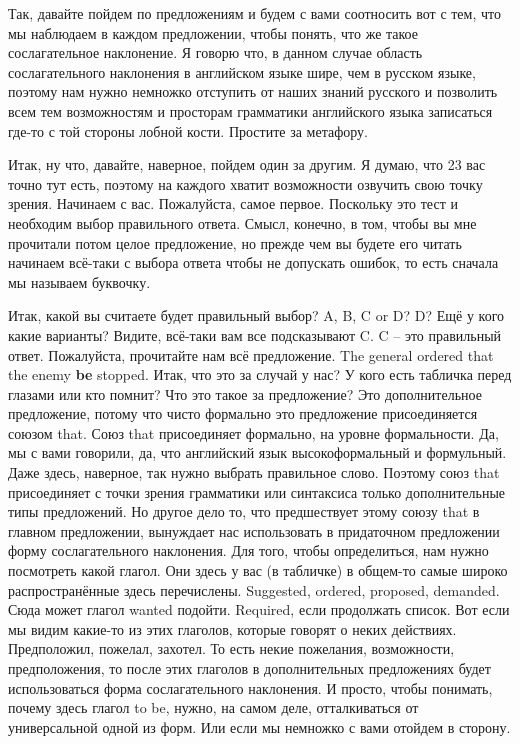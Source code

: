 \documentclass[main.tex]{subfiles}
\begin{document}
Так, давайте пойдем по предложениям и будем с вами соотносить вот с тем, что мы наблюдаем в каждом предложении, чтобы понять, что же такое сослагательное наклонение.
Я говорю что, в данном случае область сослагательного наклонения в английском языке шире, чем в русском языке, поэтому нам нужно немножко отступить от наших знаний русского и позволить всем тем возможностям и просторам грамматики английского языка записаться где-то с той стороны лобной кости.
Простите за метафору.

Итак, ну что, давайте, наверное, пойдем один за другим.
Я думаю, что 23 вас точно тут есть, поэтому на каждого хватит возможности озвучить свою точку зрения.
Начинаем с вас.
Пожалуйста, самое первое.
Поскольку это тест и необходим выбор правильного ответа.
Смысл, конечно, в том, чтобы вы мне прочитали потом целое предложение, но прежде чем вы будете его читать начинаем всё-таки с выбора ответа чтобы не допускать ошибок, то есть сначала мы называем буквочку.

Итак, какой вы считаете будет правильный выбор? A, B, C or D?
D?
Ещё у кого какие варианты?
Видите, всё-таки вам все подсказывают C.
C -- это правильный ответ.
Пожалуйста, прочитайте нам всё предложение.
The general ordered that the enemy \textbf{be} stopped.
Итак, что это за случай у нас?
У кого есть табличка перед глазами или кто помнит?
Что это такое за предложение?
Это дополнительное предложение, потому что чисто формально это предложение присоединяется союзом that.
Союз that присоединяет формально, на уровне формальности.
Да, мы с вами говорили, да, что английский язык высокоформальный и формульный.
Даже здесь, наверное, так нужно выбрать правильное слово.
Поэтому союз that присоединяет с точки зрения грамматики или синтаксиса только дополнительные типы предложений.
Но другое дело то, что предшествует этому союзу that в главном предложении, вынуждает нас использовать в придаточном предложении форму сослагательного наклонения.
Для того, чтобы определиться, нам нужно посмотреть какой глагол.
Они здесь у вас (в табличке) в общем-то самые широко распространённые здесь перечислены.
Suggested, ordered, proposed, demanded.
Сюда может глагол wanted подойти.
Required, если продолжать список.
Вот если мы видим какие-то из этих глаголов, которые говорят о неких действиях.
Предположил, пожелал, захотел.
То есть некие пожелания, возможности, предположения, то после этих глаголов в дополнительных предложениях будет использоваться форма сослагательного наклонения.
И просто, чтобы понимать, почему здесь глагол to be, нужно, на самом деле, отталкиваться от универсальной одной из форм.
Или если мы немножко с вами отойдем в сторону.
\end{document}
